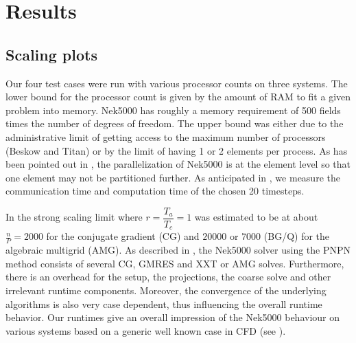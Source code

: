 \documentclass{sig-alternate}
\begin{document}
\section{Results}

\subsection{Scaling plots}

Our four test cases were run with various processor counts on three systems. The
lower bound for the processor count is given by the amount of RAM to fit a given
problem into memory. Nek5000 has roughly a memory requirement of 500 fields
times the number of degrees of freedom. The upper bound was either due to the
administrative limit of getting access to the maximum number of processors
(Beskow and Titan) or by the limit of having 1 or 2 elements per process. As has
been pointed out in , the parallelization of Nek5000 is at the
element level so that one element may not be partitioned further. 
As anticipated in , we measure the communication time and
computation time of the chosen 20 timesteps. 

In \cite{fischer:scaling} the strong scaling limit where $r=\dfrac{T_a}{T_c}=1$ was estimated
to be at about $\frac{n}{P}=2000$ for the conjugate gradient (CG) and $20000$ or
$7000$ (BG/Q) for the algebraic multigrid (AMG). As described in , the
Nek5000 solver using the PNPN method consists of several CG, GMRES and XXT or AMG solves. Furthermore,
there is an overhead for the setup, the projections, the coarse solve and other
irrelevant runtime components. Moreover, the convergence of the underlying
algorithms is also very case dependent, thus influencing the overall runtime
behavior. Our runtimes give an overall impression of the Nek5000 behaviour on
various systems based on a generic well known case in CFD (see
). 
\end{document}
